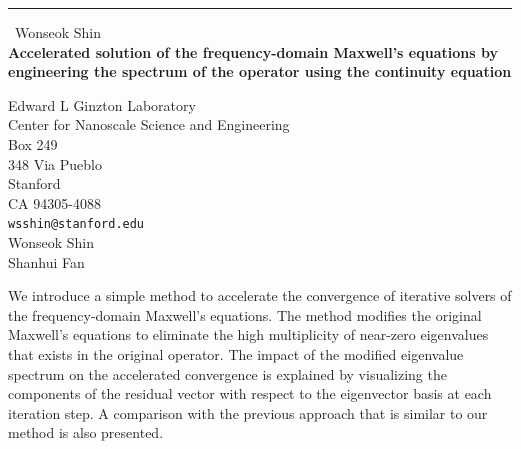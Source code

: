 \documentclass{report}
\begin{document}
\begin{center}
\rule{6in}{1pt} \
{\large Wonseok Shin \\
{\bf Accelerated solution of the frequency-domain Maxwell's equations by engineering the spectrum of the operator using the continuity equation}}

Edward L Ginzton Laboratory \\ Center for Nanoscale Science and Engineering \\ Box 249 \\ 348 Via Pueblo \\ Stanford \\ CA 94305-4088
\\
{\tt wsshin@stanford.edu}\\
Wonseok Shin\\
Shanhui Fan\end{center}

We introduce a simple method to accelerate the convergence of iterative
solvers of the frequency-domain Maxwell's equations. The method modifies
the original Maxwell's equations to eliminate the high multiplicity of
near-zero eigenvalues that exists in the original operator. The impact of
the modified eigenvalue spectrum on the accelerated convergence is
explained by visualizing the components of the residual vector with
respect to the eigenvector basis at each iteration step. A comparison
with the previous approach that is similar to our method is also
presented.
\end{document}
